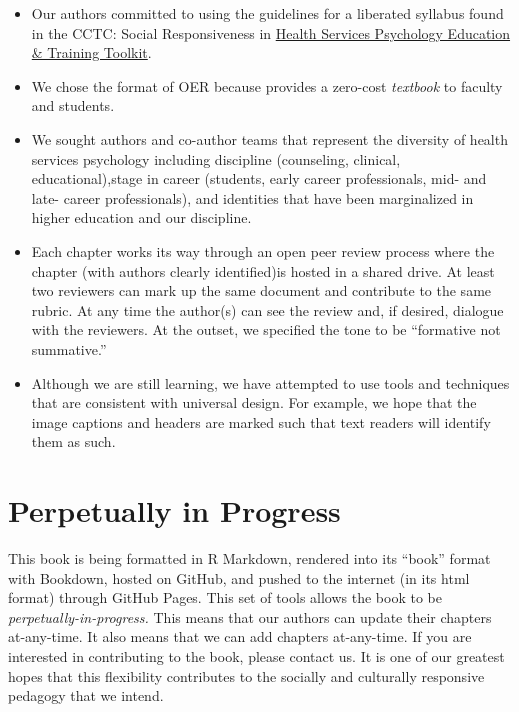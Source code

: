 \documentclass[
  11pt,
]{book}
\providecommand{\tightlist}{%
  \setlength{\itemsep}{0pt}\setlength{\parskip}{0pt}}
\begin{document}
\begin{itemize}
\tightlist
\item
  Our authors committed to using the guidelines for a liberated syllabus found in the CCTC: Social Responsiveness in \href{https://pr4tb8rrj317wdwt3xlafg2p-wpengine.netdna-ssl.com/wp-content/uploads/2021/05/CCTC_Socially-Responsive-HSP-Ed-Training_v7.pdf}{Health Services Psychology Education \& Training Toolkit}.
\item
  We chose the format of OER because provides a zero-cost \emph{textbook} to faculty and students.
\item
  We sought authors and co-author teams that represent the diversity of health services psychology including discipline (counseling, clinical, educational),stage in career (students, early career professionals, mid- and late- career professionals), and identities that have been marginalized in higher education and our discipline.
\item
  Each chapter works its way through an open peer review process where the chapter (with authors clearly identified)is hosted in a shared drive. At least two reviewers can mark up the same document and contribute to the same rubric. At any time the author(s) can see the review and, if desired, dialogue with the reviewers. At the outset, we specified the tone to be ``formative not summative.''
\item
  Although we are still learning, we have attempted to use tools and techniques that are consistent with universal design. For example, we hope that the image captions and headers are marked such that text readers will identify them as such.
\end{itemize}

\section*{Perpetually in Progress}\label{perpetually-in-progress}


This book is being formatted in R Markdown, rendered into its ``book'' format with Bookdown, hosted on GitHub, and pushed to the internet (in its html format) through GitHub Pages. This set of tools allows the book to be \emph{perpetually-in-progress.} This means that our authors can update their chapters at-any-time. It also means that we can add chapters at-any-time. If you are interested in contributing to the book, please contact us. It is one of our greatest hopes that this flexibility contributes to the socially and culturally responsive pedagogy that we intend.
\end{document}
